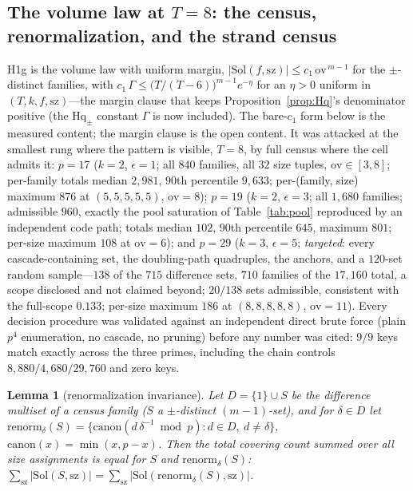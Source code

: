 \documentclass[11pt,a4paper]{article}
\numberwithin{equation}{section}
\theoremstyle{plain}
\newtheorem{lemma}[theorem]{Lemma}
\theoremstyle{definition}
\theoremstyle{remark}
\begin{document}
\subsection{The volume law at \texorpdfstring{$T=8$}{T=8}: the census, renormalization, and the strand census}\label{sec:scale-h1}

H1g is the volume law with uniform margin,
$|\mathrm{Sol}(f,\mathrm{sz})|\le c_1\,\mathrm{ov}^{\,m-1}$ for the
$\pm$-distinct families, with $c_1\,\Gamma\le\bigl(T/(T-6)\bigr)^{m-1}e^{-\eta}$
for an $\eta>0$ uniform in $(T,k,f,\mathrm{sz})$---the margin clause
that keeps Proposition~\ref{prop:Hq}'s denominator positive (the
$\mathrm{Hq}_\pm$ constant $\Gamma$ is now included). The
bare-$c_1$ form below is the measured content; the margin clause is
the open content. It was attacked at the smallest rung where the
pattern is visible, $T=8$, by full census where the cell admits it:
$p=17$ ($k=2$, $\epsilon=1$; all $840$ families, all $32$ size tuples,
$\mathrm{ov}\in[3,8]$; per-family totals median $2{,}981$, $90$th
percentile $9{,}633$; per-(family, size) maximum $876$ at
$(5,5,5,5,5)$, $\mathrm{ov}=8$); $p=19$ ($k=2$, $\epsilon=3$; all
$1{,}680$ families; admissible $960$, exactly the pool saturation of
Table~\ref{tab:pool} reproduced by an independent code path; totals
median $102$, $90$th percentile $645$, maximum $801$; per-size maximum
$108$ at $\mathrm{ov}=6$); and $p=29$ ($k=3$, $\epsilon=5$;
\emph{targeted}: every cascade-containing set, the doubling-path
quadruples, the anchors, and a $120$-set random sample---$138$ of the
$715$ difference sets, $710$ families of the $17{,}160$ total, a scope
disclosed and not claimed beyond; $20/138$ sets admissible, consistent
with the full-scope $0.133$; per-size maximum $186$ at
$(8,8,8,8,8)$, $\mathrm{ov}=11$). Every decision procedure was
validated against an independent direct brute force (plain $p^4$
enumeration, no cascade, no pruning) before any number was cited:
$9/9$ keys match exactly across the three primes, including the chain
controls $8{,}880/4{,}680/29{,}760$ and zero keys.

\begin{lemma}[renormalization invariance]\label{lem:renorm}
Let $D=\{1\}\cup S$ be the difference multiset of a census family ($S$
a $\pm$-distinct $(m-1)$-set), and for $\delta\in D$ let
$\mathrm{renorm}_\delta(S)=\{\mathrm{canon}(d\,\delta^{-1}\bmod p):
d\in D,\ d\ne\delta\}$, $\mathrm{canon}(x)=\min(x,p-x)$. Then the total
covering count summed over all size assignments is equal for $S$ and
$\mathrm{renorm}_\delta(S)$:
$\sum_{\mathrm{sz}}|\mathrm{Sol}(S,\mathrm{sz})|
=\sum_{\mathrm{sz}}|\mathrm{Sol}(\mathrm{renorm}_\delta(S),
\mathrm{sz})|$.
\end{lemma}
\end{document}
